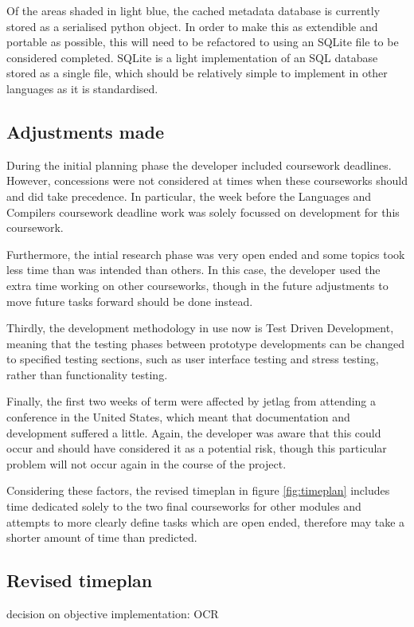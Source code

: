 Of the areas shaded in light blue, the cached metadata database is currently stored as a serialised python object. In order to make this as extendible and portable as possible, this will need to be refactored to using an SQLite file to be considered completed. SQLite is a light implementation of an SQL database stored as a single file, which should be relatively simple to implement in other languages as it is standardised.
\subsection{Adjustments made}
During the initial planning phase the developer included coursework deadlines. However, concessions were not considered at times when these courseworks should and did take precedence. In particular, the week before the Languages and Compilers coursework deadline work was solely focussed on development for this coursework.

Furthermore, the intial research phase was very open ended and some topics took less time than was intended than others. In this case, the developer used the extra time working on other courseworks, though in the future adjustments to move future tasks forward should be done instead.

Thirdly, the development methodology in use now is Test Driven Development, meaning that the testing phases between prototype developments can be changed to specified testing sections, such as user interface testing and stress testing, rather than functionality testing.

Finally, the first two weeks of term were affected by jetlag from attending a conference in the United States, which meant that documentation and development suffered a little. Again, the developer was aware that this could occur and should have considered it as a potential risk, though this particular problem will not occur again in the course of the project.

Considering these factors, the revised timeplan in figure \ref{fig:timeplan} includes time dedicated solely to the two final courseworks for other modules and attempts to more clearly define tasks which are open ended, therefore may take a shorter amount of time than predicted.

\subsection{Revised timeplan}
decision on objective implementation: OCR